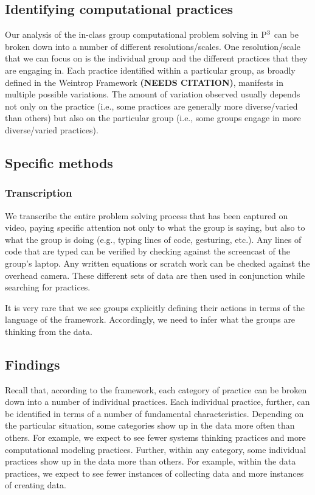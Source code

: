 \documentclass{msuphddissertation}
\begin{document}
\begin{doublespace}
%
%

\chapter{Identifying computational practices}

Our analysis of the in-class group computational problem solving in ${\rm P}^{3}$ can be broken down into a number of different resolutions/scales.  One resolution/scale that we can focus on is the individual group and the different practices that they are engaging in.  Each practice identified within a particular group, as broadly defined in the Weintrop Framework {\bf (NEEDS CITATION)}, manifests in multiple possible variations.  The amount of variation observed usually depends not only on the practice (i.e., some practices are generally more diverse/varied than others) but also on the particular group (i.e., some groups engage in more diverse/varied practices).

\section{Specific methods}

\subsection{Transcription}

We transcribe the entire problem solving process that has been captured on video, paying specific attention not only to what the group is saying, but also to what the group is doing (e.g., typing lines of code, gesturing, etc.).  Any lines of code that are typed can be verified by checking against the screencast of the group's laptop.  Any written equations or scratch work can be checked against the overhead camera.  These different sets of data are then used in conjunction while searching for practices.

It is very rare that we see groups explicitly defining their actions in terms of the language of the framework.  Accordingly, we need to infer what the groups are thinking from the data.

\section{Findings}

Recall that, according to the framework, each category of practice can be broken down into a number of individual practices.  Each individual practice, further, can be identified in terms of a number of fundamental characteristics.  Depending on the particular situation, some categories show up in the data more often than others.  For example, we expect to see fewer systems thinking practices and more computational modeling practices.  Further, within any category, some individual practices show up in the data more than others.  For example, within the data practices, we expect to see fewer instances of collecting data and more instances of creating data.


\end{doublespace}
\end{document}
